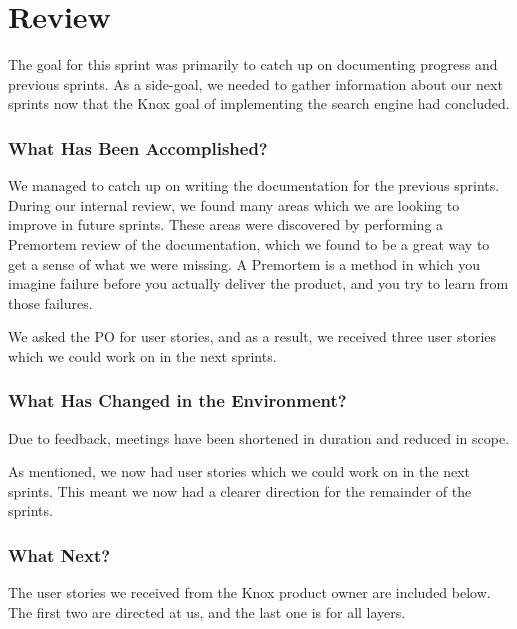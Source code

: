 \section{Review}
The goal for this sprint was primarily to catch up on documenting progress and previous sprints. As a side-goal, we needed to gather information about our next sprints now that the Knox goal of implementing the search engine had concluded.

\subsubsection*{What Has Been Accomplished?}
We managed to catch up on writing the documentation for the previous sprints. During our internal review, we found many areas which we are looking to improve in future sprints. These areas were discovered by performing a Premortem review of the documentation, which we found to be a great way to get a sense of what we were missing. A Premortem is a method in which you imagine failure before you actually deliver the product, and you try to learn from those failures\cite{PremortemSadanForbedrer}.

We asked the \knox{} PO for user stories, and as a result, we received three user stories which we could work on in the next sprints.

\subsubsection*{What Has Changed in the Environment?}
Due to feedback, meetings have been shortened in duration and reduced in scope. 

As mentioned, we now had user stories which we could work on in the next sprints. This meant we now had a clearer direction for the remainder of the sprints.

\subsubsection*{What Next?}
The user stories we received from the Knox product owner are included below. The first two are directed at us, and the last one is for all \knox{} layers.


